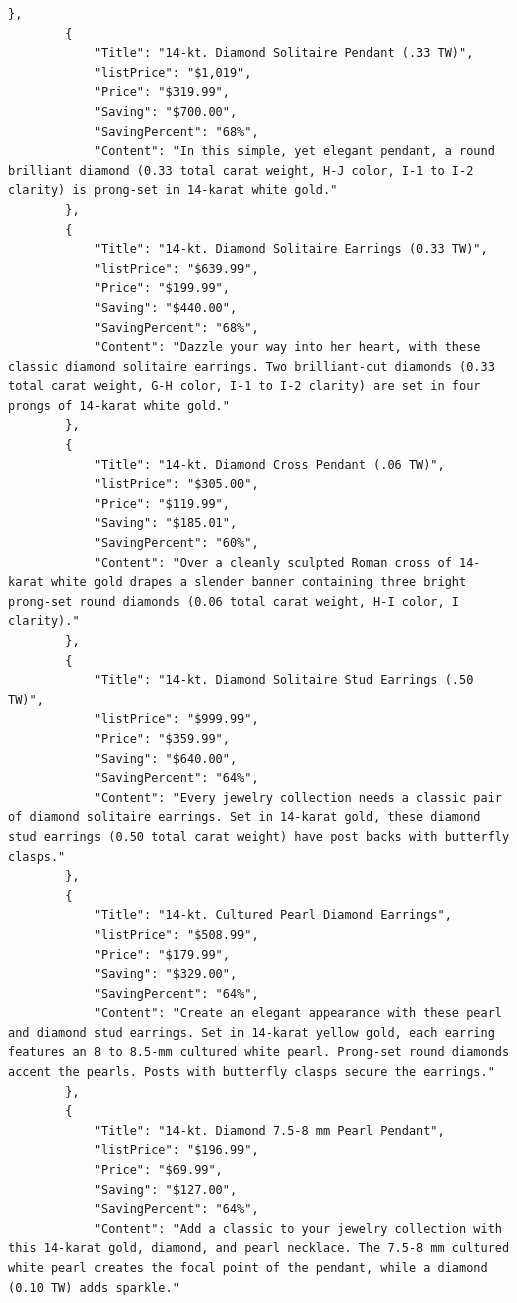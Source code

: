 \documentclass[runningheads]{llncs}
\begin{document}
\begin{lstlisting}[caption={Results for jewlary website},captionpos=b, label={lst:label2}]
        },
        {
            "Title": "14-kt. Diamond Solitaire Pendant (.33 TW)",
            "listPrice": "$1,019",
            "Price": "$319.99",
            "Saving": "$700.00",
            "SavingPercent": "68%",
            "Content": "In this simple, yet elegant pendant, a round brilliant diamond (0.33 total carat weight, H-J color, I-1 to I-2 clarity) is prong-set in 14-karat white gold."
        },
        {
            "Title": "14-kt. Diamond Solitaire Earrings (0.33 TW)",
            "listPrice": "$639.99",
            "Price": "$199.99",
            "Saving": "$440.00",
            "SavingPercent": "68%",
            "Content": "Dazzle your way into her heart, with these classic diamond solitaire earrings. Two brilliant-cut diamonds (0.33 total carat weight, G-H color, I-1 to I-2 clarity) are set in four prongs of 14-karat white gold."
        },
        {
            "Title": "14-kt. Diamond Cross Pendant (.06 TW)",
            "listPrice": "$305.00",
            "Price": "$119.99",
            "Saving": "$185.01",
            "SavingPercent": "60%",
            "Content": "Over a cleanly sculpted Roman cross of 14-karat white gold drapes a slender banner containing three bright prong-set round diamonds (0.06 total carat weight, H-I color, I clarity)."
        },
        {
            "Title": "14-kt. Diamond Solitaire Stud Earrings (.50 TW)",
            "listPrice": "$999.99",
            "Price": "$359.99",
            "Saving": "$640.00",
            "SavingPercent": "64%",
            "Content": "Every jewelry collection needs a classic pair of diamond solitaire earrings. Set in 14-karat gold, these diamond stud earrings (0.50 total carat weight) have post backs with butterfly clasps."
        },
        {
            "Title": "14-kt. Cultured Pearl Diamond Earrings",
            "listPrice": "$508.99",
            "Price": "$179.99",
            "Saving": "$329.00",
            "SavingPercent": "64%",
            "Content": "Create an elegant appearance with these pearl and diamond stud earrings. Set in 14-karat yellow gold, each earring features an 8 to 8.5-mm cultured white pearl. Prong-set round diamonds accent the pearls. Posts with butterfly clasps secure the earrings."
        },
        {
            "Title": "14-kt. Diamond 7.5-8 mm Pearl Pendant",
            "listPrice": "$196.99",
            "Price": "$69.99",
            "Saving": "$127.00",
            "SavingPercent": "64%",
            "Content": "Add a classic to your jewelry collection with this 14-karat gold, diamond, and pearl necklace. The 7.5-8 mm cultured white pearl creates the focal point of the pendant, while a diamond (0.10 TW) adds sparkle."

\end{lstlisting}
\end{document}
